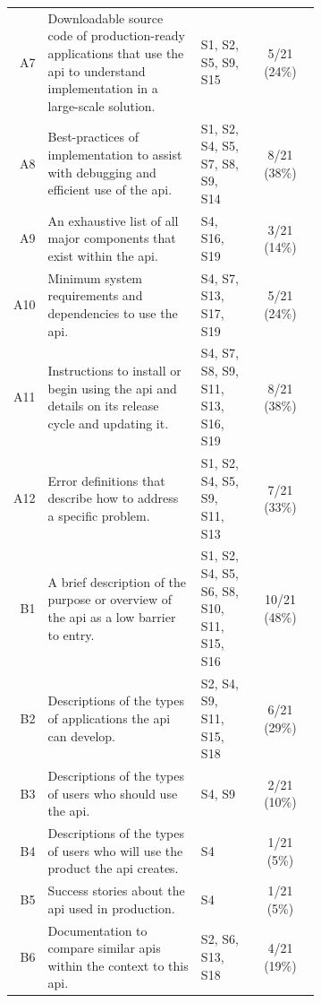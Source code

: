 \begin{small}
\begin{longtable}{rp{0.5\linewidth}|p{0.175\linewidth}|c}
  A7&
  Downloadable source code of production-ready applications that use the \gls{api} to understand implementation in a large-scale solution.
  &
  S1, S2, S5, S9, S15 &
  5/21 (24\%)\\

  A8&
  Best-practices of implementation to assist with debugging and efficient use of the \gls{api}.
  &
  S1, S2, S4, S5, S7, S8, S9, S14 &
  8/21 (38\%)\\

  A9&
  An exhaustive list of all major components that exist within the \gls{api}.
  &
  S4, S16, S19 &
  3/21 (14\%)\\

  A10&
  Minimum system requirements and dependencies to use the \gls{api}.
  &
  S4, S7, S13, S17, S19 &
  5/21 (24\%)\\
  
  A11&
  Instructions to install or begin using the \gls{api} and details on its release cycle and updating it.
  &
  S4, S7, S8, S9, S11, S13, S16, S19 &
  8/21 (38\%)\\

  A12&
  Error definitions that describe how to address a specific problem.
  &
  S1, S2, S4, S5, S9, S11, S13 &
  7/21 (33\%)\\

  \midrule
  
  {B1}&
  {A brief description of the purpose or overview of the \gls{api} as a low barrier to entry.}
  &
  {S1, S2, S4, S5, S6, S8, S10, S11, S15, S16} &
  {10/21 (48\%)}\\

  B2&
  Descriptions of the types of applications the \gls{api} can develop.
  &
  S2, S4, S9, S11, S15, S18 &
  6/21 (29\%)\\

  B3&
  Descriptions of the types of users who should use the \gls{api}.
  &
  S4, S9 &
  2/21 (10\%)\\


  B4&
  Descriptions of the types of users who will use the product the \gls{api} creates.
  &
  S4 &
  1/21 (5\%)\\


  B5&
  Success stories about the \gls{api} used in production.
  &
  S4 &
  1/21 (5\%)\\


  B6&
  Documentation to compare similar \glspl{api} within the context to this \gls{api}.
  &
  S2, S6, S13, S18 &
  4/21 (19\%)\\



\end{longtable}
\end{small}
